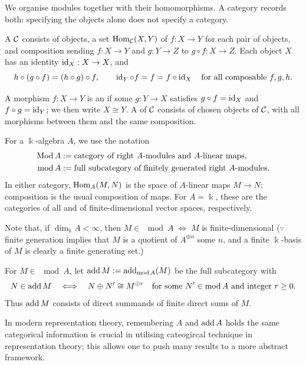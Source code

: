 We organise modules together with their homomorphisms. A category records both: specifying the objects alone does not specify a category.

\begin{definition}\label{def:category}
A  $\mathcal{C}$ consists of objects, a set $\operatorname{Hom}\nolimits_{\mathcal{C}}(X,Y)$ of  $f:X\to Y$ for each pair of objects, and composition sending $f:X\to Y$ and $g:Y\to Z$ to $g\circ f:X\to Z$.
Each object $X$ has an identity $\operatorname{id}_X:X\to X$, and
\[
h\circ(g\circ f)=(h\circ g)\circ f,
\qquad \operatorname{id}_Y\circ f=f=f\circ\operatorname{id}_X
\quad\text{for all composable }f,g,h.
\]
\end{definition}

A morphism $f:X\to Y$ is an  if some $g:Y\to X$ satisfies $g\circ f=\operatorname{id}_X$ and $f\circ g=\operatorname{id}_Y$; we then write $X\cong Y$.
A  of $\mathcal{C}$ consists of chosen objects of $\mathcal{C}$, with all morphisms between them and the same composition.

\begin{example}\label{ex:module-categories}
For a $\Bbbk$-algebra $A$, we use the notation
\[
\begin{aligned}
\operatorname{\mathrm{Mod}} A&:=\text{category of right $A$-modules and $A$-linear maps},\\
\operatorname{\mathrm{mod}} A&:=\text{full subcategory of finitely generated right $A$-modules}.
\end{aligned}
\]
In either category, $\operatorname{Hom}\nolimits_A(M,N)$ is the space of $A$-linear maps $M\to N$; composition is the usual composition of maps.
For $A=\Bbbk$, these are the categories of all and of finite-dimensional vector spaces, respectively.

Note that, if $\dim_\Bbbk A<\infty$, then $M\in \mod A \;\Leftrightarrow\; M$ is finite-dimensional ($\because$ finite generation implies that $M$ is a quotient of $A^{\oplus n}$ some $n$, and a finite $\Bbbk$-basis of $M$ is clearly a finite generating set.)
\end{example}

\begin{example}\label{ex:add-category}
For $M\in\mod A$, let $\operatorname{add} M:=\operatorname{add}_{\operatorname{\mathrm{mod}} A}(M)$ be the full subcategory with
\[
N\in\operatorname{add} M
\quad\Longleftrightarrow\quad
N\oplus N'\cong M^{\oplus r}
\quad\text{for some }N'\in\operatorname{\mathrm{mod}} A\text{ and integer }r\geq0.
\]
Thus $\operatorname{add} M$ consists of direct summands of finite direct sums of $M$.
\end{example}

In modern representation theory, remembering $A$ and $\operatorname{add} A$ holds the same categorical information is crucial in utilising cateogircal technique in representation theory; this allows one to push many results to a more abstract framework.

